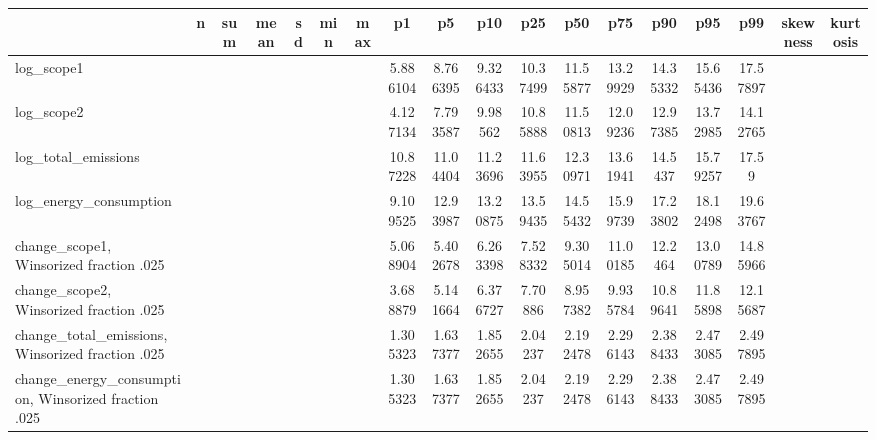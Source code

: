{
\def\sym#1{\ifmmode^{#1}\else\(^{#1}\)\fi}
\begin{tabular}{l*{1}{ccccccccccccccccc}}
\hline\hline
                    &           n&         sum&        mean&          sd&         min&         max&          p1&          p5&         p10&         p25&         p50&         p75&         p90&         p95&         p99&    skewness&    kurtosis\\
\hline
log\_scope1          &            &            &            &            &            &            &    5.886104&    8.766395&    9.326433&    10.37499&    11.55877&    13.29929&    14.35332&    15.65436&    17.57897&            &            \\
log\_scope2          &            &            &            &            &            &            &    4.127134&    7.793587&     9.98562&    10.85888&    11.50813&    12.09236&    12.97385&    13.72985&    14.12765&            &            \\
log\_total\_emissions &            &            &            &            &            &            &    10.87228&    11.04404&    11.23696&    11.63955&    12.30971&    13.61941&     14.5437&    15.79257&       17.59&            &            \\
log\_energy\_consumption&            &            &            &            &            &            &    9.109525&    12.93987&    13.20875&    13.59435&    14.55432&    15.99739&    17.23802&    18.12498&    19.63767&            &            \\
change\_scope1, Winsorized fraction .025&            &            &            &            &            &            &    5.068904&    5.402678&    6.263398&    7.528332&    9.305014&    11.00185&     12.2464&    13.00789&    14.85966&            &            \\
change\_scope2, Winsorized fraction .025&            &            &            &            &            &            &    3.688879&    5.141664&    6.376727&     7.70886&    8.957382&    9.935784&    10.89641&    11.85898&    12.15687&            &            \\
change\_total\_emissions, Winsorized fraction .025&            &            &            &            &            &            &    1.305323&    1.637377&    1.852655&     2.04237&    2.192478&    2.296143&    2.388433&    2.473085&    2.497895&            &            \\
change\_energy\_consumption, Winsorized fraction .025&            &            &            &            &            &            &    1.305323&    1.637377&    1.852655&     2.04237&    2.192478&    2.296143&    2.388433&    2.473085&    2.497895&            &            \\

\end{tabular}}
